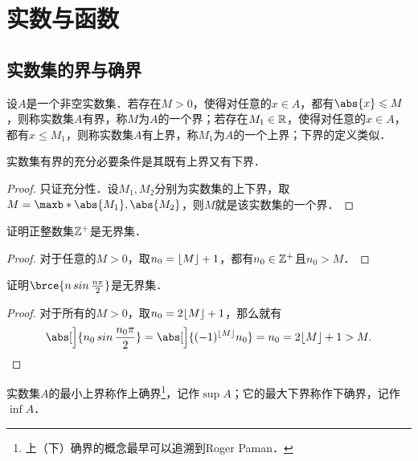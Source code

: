 \chapter{实数与函数}

\section{实数集的界与确界}

\begin{definition}
  \label{defn:bnd}
  设\(A\)是一个非空实数集．若存在\(M > 0\)，使得对任意的\(x \in A\)，都有\(\abs{x} \le M\)，则称实数集\(A\)有界，称\(M\)为\(A\)的一个界；若存在\(M_1 \in \mathbb{R}\)，使得对任意的\(x \in A\)，都有\(x \le M_1\)，则称实数集\(A\)有上界，称\(M_1\)为\(A\)的一个上界；下界的定义类似．
\end{definition}

\begin{theorem*}
  实数集有界的充分必要条件是其既有上界又有下界．

  \begin{proof}
    只证充分性．设\(M_1, M_2\)分别为实数集的上下界，取\(M = \maxb*{\abs{M_1}, \abs{M_2}}\)，则\(M\)就是该实数集的一个界．
  \end{proof}
\end{theorem*}

\begin{example*}
  证明正整数集\(\mathbb{Z}^+\)是无界集．

  \begin{proof}
    对于任意的\(M > 0\)，取\(n_0 = \lfloor M\rfloor + 1\)，都有\(n_0 \in \mathbb{Z}^+\)且\(n_0 > M\)．
  \end{proof}
\end{example*}


\begin{example*}
  证明\(\brce{n \sin \frac{n\pi}2}\)是无界集．

  \begin{proof}
    对于所有的\(M > 0\)，取\(n_0 = 2 \lfloor M\rfloor + 1\)，那么就有
    \[
      \abs[\Big]{n_0 \sin \frac{n_0\pi}2} = \abs[\Big]{(-1)^{\floor M} n_0} = n_0 = 2 \floor M + 1 > M. \qedhere
    \]
  \end{proof}
\end{example*}

\begin{definition*}
  实数集\(A\)的最小上界称作上确界\footnote{上（下）确界的概念最早可以追溯到Roger Paman\cite{PamanBio}．}，记作\(\sup A\)；它的最大下界称作下确界，记作\(\inf A\)．
\end{definition*}

